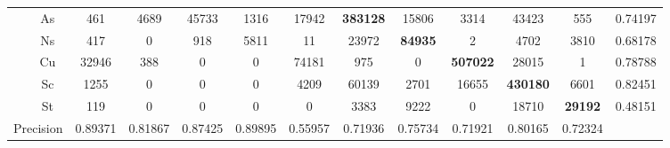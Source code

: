 \begin{table}[H]
{\begin{tabular}{ccccccccccccc}
                                                            & As                              & 461                     & 4689            & 45733           & 1316            & 17942           & \textbf{383128} & 15806          & 3314            & 43423           & 555            & 0.74197 \\
                                                            & Ns                              & 417                     & 0               & 918             & 5811            & 11              & 23972           & \textbf{84935} & 2               & 4702            & 3810           & 0.68178 \\
                                                            & Cu                              & 32946                   & 388             & 0               & 0               & 74181           & 975             & 0              & \textbf{507022} & 28015           & 1              & 0.78788 \\
                                                            & Sc                              & 1255                    & 0               & 0               & 0               & 4209            & 60139           & 2701           & 16655           & \textbf{430180} & 6601           & 0.82451 \\
                                                            & St                              & 119                     & 0               & 0               & 0               & 0               & 3383            & 9222           & 0               & 18710           & \textbf{29192} & 0.48151 \\
            \multicolumn{2}{c}{Precision}                   & 0.89371                         & 0.81867                 & 0.87425         & 0.89895         & 0.55957         & 0.71936         & 0.75734         & 0.71921        & 0.80165         & 0.72324         &                          \\ \hline
        \end{tabular}
    }
\end{table}